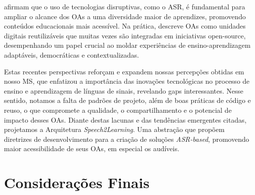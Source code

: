  afirmam que o uso de tecnologias disruptivas, como o ASR, é fundamental para ampliar o alcance dos OAs a uma diversidade maior de aprendizes, promovendo conteúdos educacionais mais acessível. Na prática,  descreve OAs como unidades digitais reutilizáveis que muitas vezes são integradas em iniciativas open-source, desempenhando um papel crucial ao moldar experiências de ensino-aprendizagem adaptáveis, democráticas e contextualizadas.

Estas recentes perspectivas reforçam e expandem nossas percepções obtidas em nosso MS, que enfatizou a importância das inovações tecnológicas no processo de ensino e aprendizagem de línguas de sinais, revelando gaps interessantes. Nesse sentido, notamos a falta de padrões de projeto, além de boas práticas de código e reuso, o que compromete a qualidade, o compartilhamento e o potencial de impacto desses OAs. Diante destas lacunas e das tendências emergentes citadas, projetamos a Arquitetura \textit{Speech2Learning}. Uma abstração que propõem diretrizes de desenvolvimento para a criação de soluções \textit{ASR-based}, promovendo maior acessibilidade de seus OAs, em especial os audíveis.

\section{Considerações Finais}